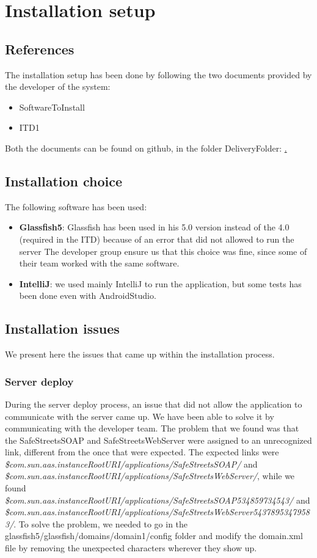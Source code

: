 \documentclass[../ATD.tex]{subfiles}
\begin{document}
    \chapter{Installation setup}\label{ch:installation-setup}
    \section{References}\label{sec:references}
    The installation setup has been done by following the two documents provided by the developer of the system:
    \begin{itemize}
        \item SoftwareToInstall
        \item ITD1
    \end{itemize}
    Both the documents can be found on github, in the folder DeliveryFolder: \href{https://github.com/gianfi12/AbboAccordiBonetti/DeliveryFolder}.

    \section{Installation choice}\label{sec:installation-choice}
    The following software has been used:
    \begin{itemize}
        \item \textbf{Glassfish5}: Glassfish has been used in his 5.0 version instead of the 4.0 (required in the ITD) because of an error that did not allowed to run the server
        The developer group ensure us that this choice was fine, since some of their team worked with the same software.
        \item \textbf{IntelliJ}: we used mainly IntelliJ to run the application, but some tests has been done even with AndroidStudio.
    \end{itemize}

    \section{Installation issues}\label{sec:installation-issues}
    We present here the issues that came up within the installation process.
    \subsection{Server deploy}\label{subsec:server-deploy}
    During the server deploy process, an issue that did not allow the application to communicate with the server came up.
    We have been able to solve it by communicating with the developer team.
    The problem that we found was that the SafeStreetsSOAP and SafeStreetsWebServer were assigned to an unrecognized link, different from the once that were expected.
    The expected links were \textit{\${com.sun.aas.instanceRootURI}/applications/SafeStreetsSOAP/} and \textit{\${com.sun.aas.instanceRootURI}/applications/SafeStreetsWebServer/},
    while we found \textit{\${com.sun.aas.instanceRootURI}/applications/SafeStreetsSOAP534859734543/} and \textit{\${com.sun.aas.instanceRootURI}/applications/SafeStreetsWebServer54378953479583/}.
    To solve the problem, we needed to go in the glassfish5/glassfish/domains/domain1/config folder and modify the domain.xml file by removing the unexpected characters wherever they show up.
\end{document}
